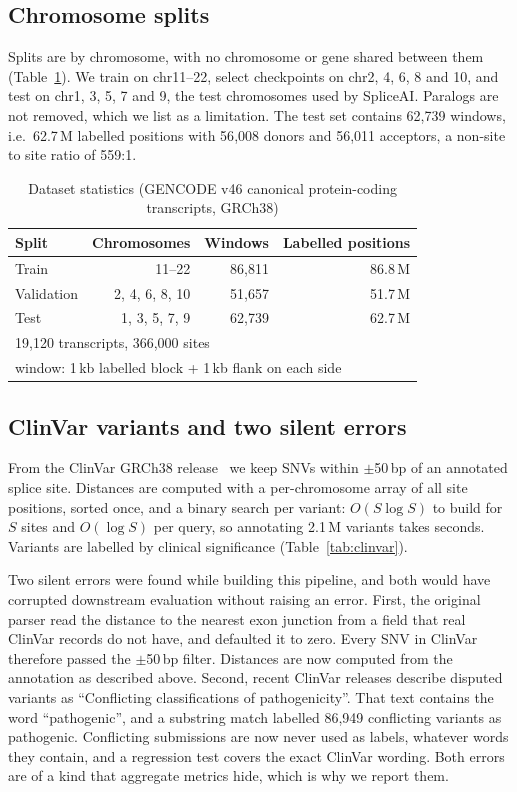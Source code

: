 \documentclass[conference]{IEEEtran}
\begin{document}
\subsection{Chromosome splits}
Splits are by chromosome, with no chromosome or gene shared between them (Table~\ref{tab:data}). We train on chr11--22, select checkpoints on chr2, 4, 6, 8 and 10, and test on chr1, 3, 5, 7 and 9, the test chromosomes used by SpliceAI. Paralogs are not removed, which we list as a limitation. The test set contains 62{,}739 windows, i.e.\ 62.7\,M labelled positions with 56{,}008 donors and 56{,}011 acceptors, a non-site to site ratio of 559:1.

\begin{table}[t]
\centering
\caption{Dataset statistics (GENCODE v46 canonical protein-coding transcripts, GRCh38)}
\label{tab:data}
\begin{tabular}{lrrr}
\toprule
Split & Chromosomes & Windows & Labelled positions \\
\midrule
Train & 11--22 & 86{,}811 & 86.8\,M \\
Validation & 2, 4, 6, 8, 10 & 51{,}657 & 51.7\,M \\
Test & 1, 3, 5, 7, 9 & 62{,}739 & 62.7\,M \\
\midrule
\multicolumn{4}{l}{19{,}120 transcripts, 366{,}000 sites} \\
\multicolumn{4}{l}{window: 1\,kb labelled block + 1\,kb flank on each side} \\
\bottomrule
\end{tabular}
\end{table}

\subsection{ClinVar variants and two silent errors}
From the ClinVar GRCh38 release~\cite{landrum2018clinvar} we keep SNVs within $\pm$50\,bp of an annotated splice site. Distances are computed with a per-chromosome array of all site positions, sorted once, and a binary search per variant: $O(S\log S)$ to build for $S$ sites and $O(\log S)$ per query, so annotating 2.1\,M variants takes seconds. Variants are labelled by clinical significance (Table~\ref{tab:clinvar}).

Two silent errors were found while building this pipeline, and both would have corrupted downstream evaluation without raising an error. First, the original parser read the distance to the nearest exon junction from a field that real ClinVar records do not have, and defaulted it to zero. Every SNV in ClinVar therefore passed the $\pm$50\,bp filter. Distances are now computed from the annotation as described above. Second, recent ClinVar releases describe disputed variants as ``Conflicting classifications of pathogenicity''. That text contains the word ``pathogenic'', and a substring match labelled 86{,}949 conflicting variants as pathogenic. Conflicting submissions are now never used as labels, whatever words they contain, and a regression test covers the exact ClinVar wording. Both errors are of a kind that aggregate metrics hide, which is why we report them.
\end{document}
